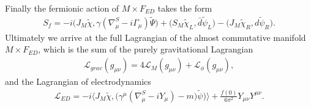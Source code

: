 Finally the fermionic action of $M\times F_{ED}$ takes the form
    \begin{align}
        S_f = -i\big(J_M\tilde{\chi}, \gamma(\nabla^S_\mu - i\Gamma_\mu)
        \tilde{\Psi}\big) + \big(S_M\tilde{\chi}_L, \bar{d}\tilde{\psi}_L\big) -
        \big(J_M\tilde{\chi}_R, d \tilde{\psi}_R\big).
    \end{align}
Ultimately we arrive at the full Lagrangian of the almost commutative
manifold $M\times F_{ED}$, which is the sum of the purely gravitational
Lagrangian
    \begin{align}
        \mathcal{L}_{grav}(g_{\mu\nu})=4\mathcal{L}_M(g_{\mu\nu})+
        \mathcal{L}_\phi (g_{\mu\nu}),
    \end{align}
and the Lagrangian of electrodynamics
    \begin{align}
        \mathcal{L}_{ED} = -i\bigg\langle
        J_M\tilde{\chi},\big(\gamma^\mu(\nabla^S_\mu - iY_\mu) -m\big)\tilde{\psi})
        \bigg\rangle
        +\frac{f(0)}{6\pi^2} Y_{\mu\nu}Y^{\mu\nu}.
    \end{align}

